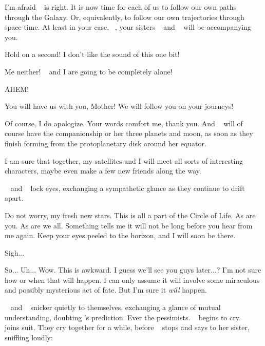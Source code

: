 \documentclass[main.tex]{subfiles}
\begin{document}
\par \Maia I'm afraid \rmalcyone~ is right.  It is now time for each of us to follow our own paths through the Galaxy.  Or, equivalently, to follow our own trajectories through space-time.  At least in your case, \rmtaygete~, your sisters \rmalcyone~ and \rmcelaeno~ will be accompanying you.

\par \Electra Hold on a second!  I don't like the sound of this one bit!

\par \Sterope Me neither! \rmelectra~ and I are going to be completely alone!

\par \Alphab AHEM!

\par \Betab You will have us with you, Mother!  We will follow you on your journeys!

\par \Sterope Of course, I do apologize.  Your words comfort me, thank you.  And \rmelectra~ will of course have the companionship or her three planets and moon, as soon as they finish forming from the protoplanetary disk around her equator.

\par \Electra I am sure that together, my satellites and I will meet all sorts of interesting characters, maybe even make a few new friends along the way.  

\par \nar \rmsterope~ and \rmelectra~ lock eyes, exchanging a sympathetic glance as they continue to drift apart.  

\par \Maia Do not worry, my fresh new stars. This is all a part of the Circle of Life.  As are you.  As are we all.  Something tells me it will not be long before you hear from me again. Keep your eyes peeled to the horizon, and I will soon be there.  

\par \Electra Sigh...  

\par \Taygete So... Uh... Wow.  This is awkward.  I guess we'll see you guys later...? I'm not sure how or when that will happen.  I can only assume it will involve some miraculous and possibly mysterious act of fate.  But I'm sure it \textit{will} happen.
  
\par \nar \rmtaygete~ and \rmalcyone~ snicker quietly to themselves, exchanging a glance of mutual understanding, doubting \rmmaia's prediction.  Ever the pessimists.  \rmelectra~ begins to cry.  \rmsterope~ joins suit.  They cry together for a while, before \rmsterope~ stops and says to her sister, sniffling loudly:
\end{document}
